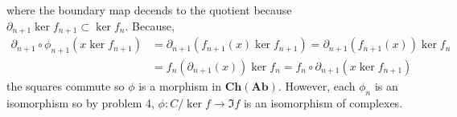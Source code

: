 \documentclass[12pt]{extarticle}
\newcommand{\abchains}{\mathbf{Ch(Ab)}}
\begin{document}
\begin{center}
\end{center}
where the boundary map decends to the quotient because $\partial_{n+1} \ker{f_{n+1}} \subset \ker{f_{n}}$. Because,
\begin{align*}
\partial_{n+1} \circ \phi_{n+1}(x \ker{f_{n+1}}) & = \partial_{n+1}( f_{n+1}(x) \ker{f_{n+1}}) = \partial_{n+1}(f_{n+1}(x)) \ker{f_{n}} 
\\
& = f_{n}(\partial_{n+1}(x)) \ker{f_{n}} = f_n \circ \partial_{n+1}(x \ker{f_{n+1}}) 
\end{align*}
the squares commute so $\phi$ is a morphism in $\abchains$. However, each $\phi_n$ is an isomorphism so by problem 4, $\phi : C / \ker{f} \to \Im{f}$ is an isomorphism of complexes. 
\end{document}
